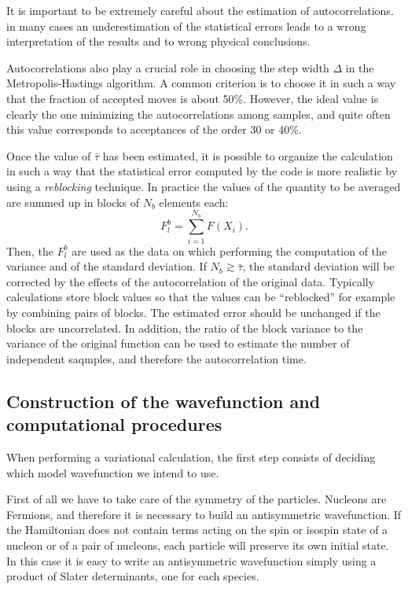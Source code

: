 It is important to be extremely careful about the estimation of autocorrelations. in many cases an underestimation of the statistical errors leads to a wrong interpretation of the results and to wrong physical conclusions.

Autocorrelations also play a crucial role in choosing the step width $\Delta$ in the Metropolis-Hastings algorithm. A common criterion is to choose it in such a way that the fraction of accepted moves is about 50\%. However, the ideal value is clearly the one minimizing the autocorrelations among samples, and quite often this value corresponds to acceptances of the order 30 or 40\%. 

Once the value of $\bar{\tau}$ has been estimated, it is possible to organize the calculation in such a way that the statistical error computed by the code is more realistic by using a {\it reblocking}
technique. In practice the values of the quantity to be averaged are summed up in blocks of $N_b$ elements each:
\begin{equation}
F^b_l=\sum_{i=1}^{N_b} F(X_i).
\end{equation} 
Then, the $F^b_l$ are used as the data on which performing the computation of the variance and of the standard deviation. If $N_b\gtrsim\bar{\tau}$, the standard deviation will be corrected by the effects of the autocorrelation of the original data.
Typically calculations store block values so that the values can be
``reblocked'' for example by combining pairs of blocks. The estimated
error should be unchanged if the blocks are uncorrelated. In addition,
the ratio of
the block variance to the variance of the original
function can be used to estimate the number of independent saqmples,
and therefore the autocorrelation time.

\subsection{Construction of the wavefunction and computational procedures}

When performing a variational calculation, the first step consists of deciding which model wavefunction we intend to use. 

First of all we have to take care of the symmetry of the particles. Nucleons are Fermions, and therefore it is necessary to build an antisymmetric wavefunction. If the Hamiltonian does not contain terms acting on the spin or isospin state of a nucleon or of a pair of nucleons, each particle will preserve its own initial state. In this case it is easy to write an antisymmetric wavefunction simply using a product of Slater determinants, one for each species. 

